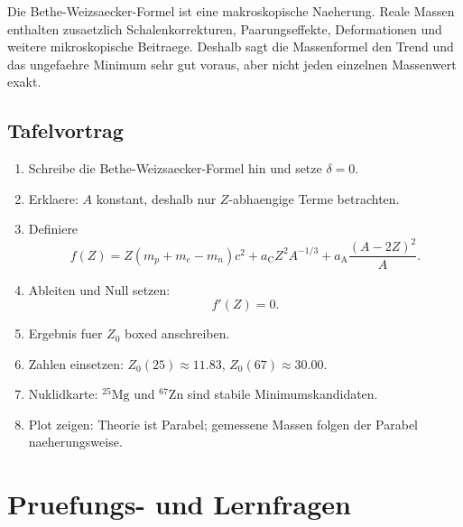 \documentclass[11pt,a4paper]{scrartcl}
\newcommand{\isotope}[2]{^{#1}\mathrm{#2}}
\theoremstyle{definition}
\theoremstyle{plain}
\theoremstyle{remark}
\newcommand{\aC}{a_{\mathrm C}}
\newcommand{\aA}{a_{\mathrm A}}
\begin{document}
\begin{warningbox}[title=Warum die gemessenen Punkte nicht perfekt auf der Parabel liegen]
Die Bethe-Weizsaecker-Formel ist eine makroskopische Naeherung. Reale Massen enthalten zusaetzlich Schalenkorrekturen, Paarungseffekte, Deformationen und weitere mikroskopische Beitraege. Deshalb sagt die Massenformel den Trend und das ungefaehre Minimum sehr gut voraus, aber nicht jeden einzelnen Massenwert exakt.
\end{warningbox}

\subsection{Tafelvortrag}
\begin{summarybox}[title=8-Minuten-Struktur]
\begin{enumerate}
    \item Schreibe die Bethe-Weizsaecker-Formel hin und setze $\delta=0$.
    \item Erklaere: $A$ konstant, deshalb nur $Z$-abhaengige Terme betrachten.
    \item Definiere
    \[
        f(Z)=Z(m_p+m_e-m_n)c^2+\aC Z^2A^{-1/3}+\aA\frac{(A-2Z)^2}{A}.
    \]
    \item Ableiten und Null setzen:
    \[
        f'(Z)=0.
    \]
    \item Ergebnis fuer $Z_0$ boxed anschreiben.
    \item Zahlen einsetzen: $Z_0(25)\approx11.83$, $Z_0(67)\approx30.00$.
    \item Nuklidkarte: $\isotope{25}{Mg}$ und $\isotope{67}{Zn}$ sind stabile Minimumskandidaten.
    \item Plot zeigen: Theorie ist Parabel; gemessene Massen folgen der Parabel naeherungsweise.
\end{enumerate}
\end{summarybox}

\newpage

\section*{Pruefungs- und Lernfragen}
\end{document}
